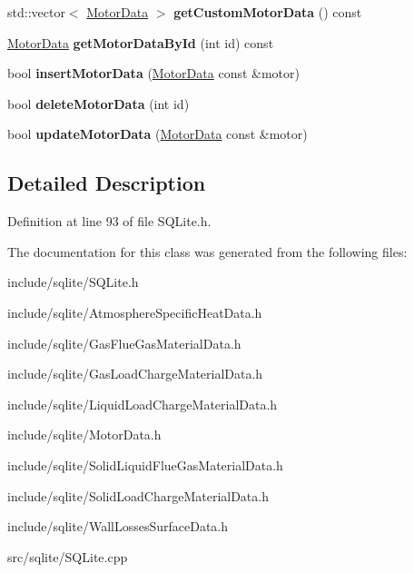 \begin{DoxyCompactItemize}
\mbox{\label{class_s_q_lite_a0cc4f6952652d05d6a87e2f7cc232d57}} 
std\+::vector$<$ \hyperlink{class_motor_data}{Motor\+Data} $>$ {\bfseries get\+Custom\+Motor\+Data} () const
\item 
\mbox{\label{class_s_q_lite_a4b0a99992e2909216b40dc499c86a028}} 
\hyperlink{class_motor_data}{Motor\+Data} {\bfseries get\+Motor\+Data\+By\+Id} (int id) const
\item 
\mbox{\label{class_s_q_lite_a38eb0f1501e0918c267a9ab3a0953a54}} 
bool {\bfseries insert\+Motor\+Data} (\hyperlink{class_motor_data}{Motor\+Data} const \&motor)
\item 
\mbox{\label{class_s_q_lite_ab1f59cd24e3931970bc39079b0a5e612}} 
bool {\bfseries delete\+Motor\+Data} (int id)
\item 
\mbox{\label{class_s_q_lite_a7909128eed1b0612ecdf7c50edf1426a}} 
bool {\bfseries update\+Motor\+Data} (\hyperlink{class_motor_data}{Motor\+Data} const \&motor)
\end{DoxyCompactItemize}


\subsection{Detailed Description}


Definition at line 93 of file S\+Q\+Lite.\+h.



The documentation for this class was generated from the following files\+:\begin{DoxyCompactItemize}
\item 
include/sqlite/S\+Q\+Lite.\+h\item 
include/sqlite/Atmosphere\+Specific\+Heat\+Data.\+h\item 
include/sqlite/Gas\+Flue\+Gas\+Material\+Data.\+h\item 
include/sqlite/Gas\+Load\+Charge\+Material\+Data.\+h\item 
include/sqlite/Liquid\+Load\+Charge\+Material\+Data.\+h\item 
include/sqlite/Motor\+Data.\+h\item 
include/sqlite/Solid\+Liquid\+Flue\+Gas\+Material\+Data.\+h\item 
include/sqlite/Solid\+Load\+Charge\+Material\+Data.\+h\item 
include/sqlite/Wall\+Losses\+Surface\+Data.\+h\item 
src/sqlite/S\+Q\+Lite.\+cpp\end{DoxyCompactItemize}
